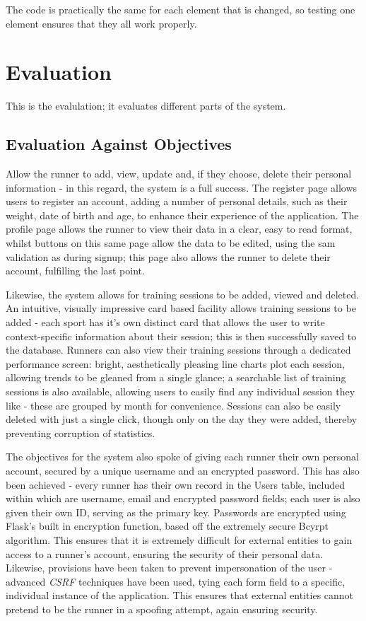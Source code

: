 \documentclass{article}[12pt,a4paper]
\begin{document}
{\clearpage

The code is practically the same for each element that is changed, so testing one element ensures that they all work properly.

\section{Evaluation}
This is the evalulation; it evaluates different parts of the system.

\subsection{Evaluation Against Objectives}
Allow the runner to add, view, update and, if they choose, delete their personal information - in this regard, the system is a full success. The register page allows users to register an account, adding a number of personal details, such as their weight, date of birth and age, to enhance their experience of the application. The profile page allows the runner to view their data in a clear, easy to read format, whilst buttons on this same page allow the data to be edited, using the sam validation as during signup; this page also allows the runner to delete their account, fulfilling the last point.

Likewise, the system allows for training sessions to be added, viewed and deleted. An intuitive, visually impressive card based facility allows training sessions to be added - each sport has it's own distinct card that allows the user to write context-specific information about their session; this is then successfully saved to the database. Runners can also view their training sessions through a dedicated performance screen: bright, aesthetically pleasing line charts plot each session, allowing trends to be gleaned from a single glance; a searchable list of training sessions is also available, allowing users to easily find any individual session they like - these are grouped by month for convenience. Sessions can also be easily deleted with just a single click, though only on the day they were added, thereby preventing corruption of statistics.

The objectives for the system also spoke of giving each runner their own personal account, secured by a unique username and an encrypted password. This has also been achieved - every runner has their own record in the Users table, included within which are username, email and encrypted password fields; each user is also given their own ID, serving as the primary key. Passwords are encrypted using Flask's built in encryption function, based off the extremely secure Bcyrpt algorithm. This ensures that it is extremely difficult for external entities to gain access to a runner's account, ensuring the security of their personal data. Likewise, provisions have been taken to prevent impersonation of the user - advanced \textit{CSRF} techniques have been used, tying each form field to a specific, individual instance of the application. This ensures that external entities cannot pretend to be the runner in a spoofing attempt, again ensuring security.

}
\end{document}
